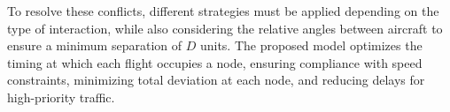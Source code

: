 \documentclass[../../thesis.tex]{subfiles}
\begin{document}
To resolve these conflicts, different strategies must be applied depending on the type of interaction, while also considering the relative angles between aircraft to ensure a minimum separation of $D$ units.  
The proposed model optimizes the timing at which each flight occupies a node, ensuring compliance with speed constraints, minimizing total deviation at each node, and reducing delays for high-priority traffic.%
\end{document}
